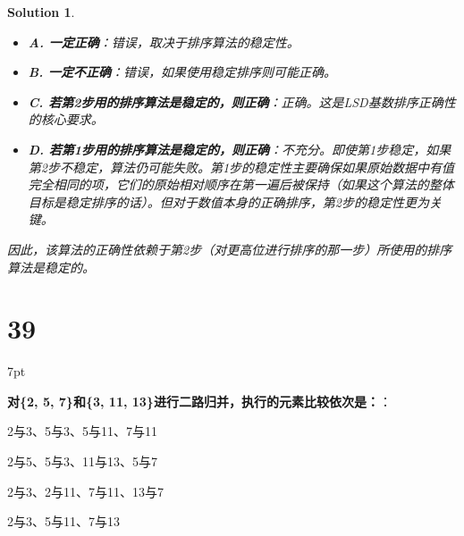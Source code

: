 \documentclass[UTF8]{report}
\newtheorem{solution}{Solution}
\theoremstyle{MyLineTheoremStyle} %
\theoremstyle{MyBlockTheoremStyle} %
\theoremstyle{MySubsubsectionStyle} %
\newenvironment{graybox}{%
        \def\FrameCommand{%
        \hspace{1pt}%
        {\color{gray}\small \vrule width 2pt}%
        {\color{graybox_color}\vrule width 4pt}%
        \colorbox{graybox_color}%
        }%
        \MakeFramed{\advance\hsize-\width\FrameRestore}%
        \noindent\hspace{-4.55pt}%
        \begin{adjustwidth}{}{7pt}%
        \vspace{2pt}\vspace{2pt}%
        }
        {%
        \vspace{2pt}\end{adjustwidth}\endMakeFramed%
        }
\begin{document}
\begin{solution}
\begin{itemize}
    \item \textbf{A. 一定正确}：错误，取决于排序算法的稳定性。
    \item \textbf{B. 一定不正确}：错误，如果使用稳定排序则可能正确。
    \item \textbf{C. 若第2步用的排序算法是稳定的，则正确}：正确。这是LSD基数排序正确性的核心要求。
    \item \textbf{D. 若第1步用的排序算法是稳定的，则正确}：不充分。即使第1步稳定，如果第2步不稳定，算法仍可能失败。第1步的稳定性主要确保如果原始数据中有值完全相同的项，它们的原始相对顺序在第一遍后被保持（如果这个算法的整体目标是稳定排序的话）。但对于数值本身的正确排序，第2步的稳定性更为关键。
\end{itemize}
因此，该算法的正确性依赖于第2步（对更高位进行排序的那一步）所使用的排序算法是稳定的。
\end{solution}





\section*{39}

\begin{graybox}
\textbf{对\{2, 5, 7\}和\{3, 11, 13\}进行二路归并，执行的元素比较依次是：}：
\begin{circledenum}
    \item 2与3、5与3、5与11、7与11
    \item 2与5、5与3、11与13、5与7
    \item 2与3、2与11、7与11、13与7
    \item 2与3、5与11、7与13
\end{circledenum}
\end{graybox}
\end{document}
